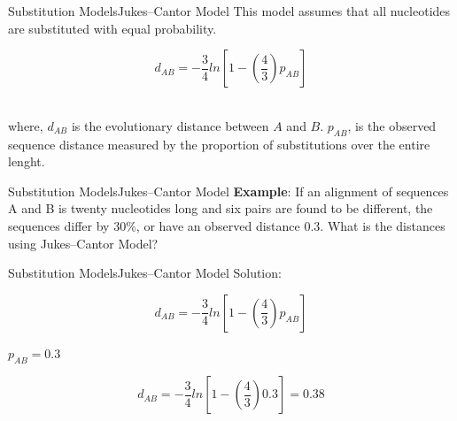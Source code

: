 \documentclass[10pt]{beamer}
\newcommand{\1}{
	\setbeamertemplate{background}{
		\texttt{[image: img/1]}
		\tikz[overlay] \fill[fill opacity=0.75,fill=white] (0,0) rectangle (-\paperwidth,\paperheight);
	}
}
\begin{document}
\begin{frame}{Substitution Models}{Jukes–Cantor Model}	
	This model assumes that all nucleotides are substituted with equal probability.

	\begin{equation}
		d_{AB} = -\frac{3}{4} ln \left[  1 - \left( \frac{4}{3} \right) p_{AB}  \right] 
	\end{equation}\\
	
	\vspace{0.5cm}
	
	where, $d_{AB}$ is the evolutionary distance between $A$ and $B$. $p_{AB}$, is the observed sequence distance measured by the proportion of substitutions over the entire lenght. \\
\end{frame}

\begin{frame}{Substitution Models}{Jukes–Cantor Model}	
	\textbf{Example}: If an alignment of sequences A and B is twenty nucleotides long and
	six pairs are found to be different, the sequences differ by 30\%, or have an observed
	distance 0.3. What is the distances using Jukes–Cantor Model?		
\end{frame}

\begin{frame}{Substitution Models}{Jukes–Cantor Model}	
	Solution:
	
	\begin{equation*}
	d_{AB} = -\frac{3}{4} ln \left[  1 - \left( \frac{4}{3} \right) p_{AB}  \right] 
	\end{equation*}\\	
	
	$p_{AB} = 0.3$
	
	\begin{equation*}
	d_{AB} = -\frac{3}{4} ln \left[  1 - \left( \frac{4}{3} \right) 0.3  \right]  = 0.38
	\end{equation*}\\
	
\end{frame}
\end{document}
